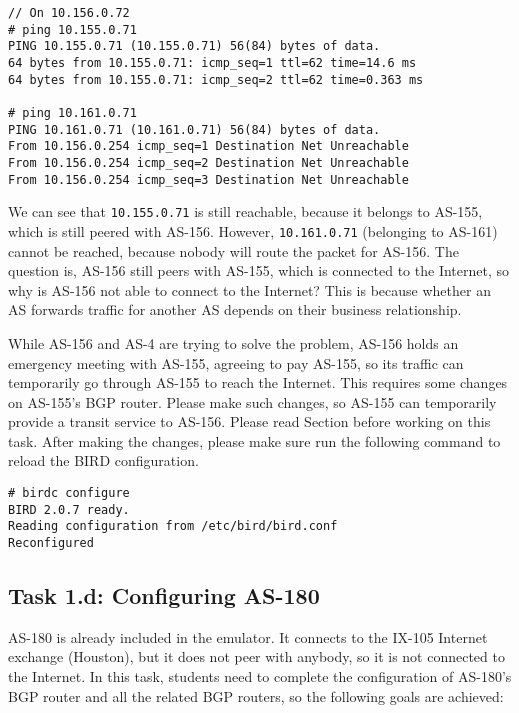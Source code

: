 \begin{lstlisting}
// On 10.156.0.72
# ping 10.155.0.71
PING 10.155.0.71 (10.155.0.71) 56(84) bytes of data.
64 bytes from 10.155.0.71: icmp_seq=1 ttl=62 time=14.6 ms
64 bytes from 10.155.0.71: icmp_seq=2 ttl=62 time=0.363 ms

# ping 10.161.0.71
PING 10.161.0.71 (10.161.0.71) 56(84) bytes of data.
From 10.156.0.254 icmp_seq=1 Destination Net Unreachable
From 10.156.0.254 icmp_seq=2 Destination Net Unreachable
From 10.156.0.254 icmp_seq=3 Destination Net Unreachable
\end{lstlisting}
 
We can see that \texttt{10.155.0.71} is still reachable, because it
belongs to AS-155, which is still peered with AS-156. However,
\texttt{10.161.0.71} (belonging to AS-161) cannot be reached, because 
nobody will route the packet for AS-156.
The question is, AS-156 still peers with AS-155, 
which is connected to the Internet, so why is AS-156 not able to 
connect to the Internet?  This is because whether an AS forwards 
traffic for another AS depends on their business relationship. 


While AS-156 and AS-4 are trying to solve the problem, AS-156 holds an 
emergency meeting with AS-155, agreeing to pay AS-155, so its 
traffic can temporarily go through AS-155 to reach the Internet. 
This requires some changes on AS-155's BGP router. 
Please make such changes, so AS-155 can temporarily 
provide a transit service to AS-156.
Please read Section \bigcommunity before working on this task. 
After making the changes, please make sure run the following 
command to reload the BIRD configuration.

\begin{lstlisting}
# birdc configure
BIRD 2.0.7 ready.
Reading configuration from /etc/bird/bird.conf
Reconfigured
\end{lstlisting}
 

 
\subsection{Task 1.d: Configuring AS-180} 

AS-180 is already included in the emulator. It connects to the
IX-105 Internet exchange (Houston), but it does not peer with anybody, 
so it is not connected to the Internet. 
In this task, students need to complete the configuration of 
AS-180's BGP router and all the related BGP routers, 
so the following goals are achieved:

